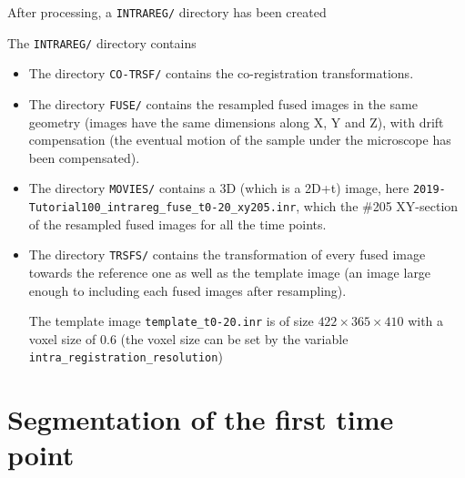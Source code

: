 After processing, a \texttt{INTRAREG/} directory has been created

\mbox{}
\mbox{}

The \texttt{INTRAREG/} directory contains

\mbox{}
\mbox{}

\begin{itemize}
\itemsep -1ex
\item The directory \texttt{CO-TRSF/} contains the co-registration
  transformations.
\item The directory \texttt{FUSE/} contains the resampled fused images
  in the same geometry (images have the same dimensions along X, Y and
  Z), with drift compensation (the eventual motion of the sample under the
  microscope has been compensated). 
\item The directory \texttt{MOVIES/} contains a 3D (which is a 2D+t)
  image, here
  \texttt{2019-Tutorial100\_intrareg\_fuse\_t0-20\_xy205.inr}, which
  the \#205 XY-section of the resampled fused images for all the time
  points.
\item The directory \texttt{TRSFS/}  contains the transformation of
  every fused image towards the reference one as well as the template
  image (an image large enough to including each fused images after
  resampling).

  The template image \texttt{template\_t0-20.inr} is of size $422
  \times 365 \times 410$ with a voxel size of 0.6 (the voxel size can
  be set by the variable \texttt{intra\_registration\_resolution})
\end{itemize}





\section{Segmentation of the first time point}


